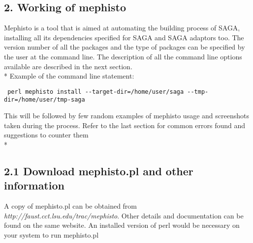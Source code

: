 \documentclass[a4paper,10pt]{article}
\begin{document}
\begin{multicols}{2}
\section*{\normalsize 2. Working of mephisto}
Mephisto is a tool that is aimed at  automating the building process of SAGA, installing all its dependencies specified for SAGA and SAGA adaptors too.  
The version number of all the packages and the type of packages can be specified by the user at the command line. The description of all the command 
line options available are described in the next section.\\*
Example of the command line statement: 
\begin{verbatim} perl mephisto install --target-dir=/home/user/saga --tmp-dir=/home/user/tmp-saga \end{verbatim} 
This will be followed by few random examples of mephisto usage and screenshots taken during the
process. Refer to the last section for common errors found and suggestions to counter them\\*
\subsection*{\normalsize 2.1 Download mephisto.pl and other information}
A copy of mephisto.pl can be obtained from \emph{http://faust.cct.lsu.edu/trac/mephisto}. 
Other details and documentation can be found on the same website. 
An installed version of perl would be necessary on your system to run mephisto.pl 

\end{multicols}
\end{document}
